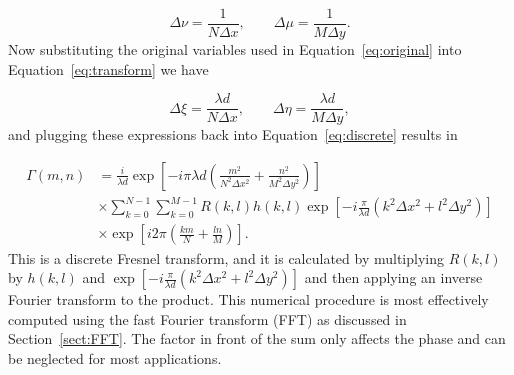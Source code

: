     \begin{equation}
        \Delta\nu=\frac{1}{N\Delta x}, \qquad \Delta\mu=\frac{1}{M\Delta y}.
        \label{eq:transform}
    \end{equation}
    Now substituting the original variables used in Equation~\ref{eq:original} into
    Equation~\ref{eq:transform} we have

    \begin{equation}
        \Delta\xi=\frac{\lambda d}{N\Delta x}, \qquad \Delta\eta=\frac{
        \lambda d}{M\Delta y},
    \end{equation}
    and plugging these expressions back into Equation~\ref{eq:discrete} results
    in

    \begin{equation}
    \begin{aligned}
        \Gamma(m,n) & = \frac{i}{\lambda d}\exp\left[ -i\pi \lambda d\left(
            \frac{m^2}{N^2\Delta x^2}+\frac{n^2}{M^2\Delta y^2}
        \right)\right]\\
        &\times
        \sum_{k=0}^{N-1}\sum_{k=0}^{M-1}R(k,l)h(k,l)\exp\left[ -i
        \frac{\pi}{\lambda d}\left( k^2\Delta x^2+l^2\Delta y^2 \right)
    \right] \\
    &\times \exp\left[ i2\pi\left( \frac{km}{N}+\frac{ln}{M} \right) \right].
    \end{aligned}
    \end{equation}
    This is a discrete Fresnel transform, and it is calculated by multiplying
    $R(k,l)$ by $h(k,l)$ and $\exp\left[ -i
        \frac{\pi}{\lambda d}\left( k^2\Delta x^2+l^2\Delta y^2 \right)
    \right]$
    and then applying an inverse Fourier transform to the product. This
    numerical procedure is
    most effectively computed using the fast Fourier transform (FFT) as
    discussed in Section~\ref{sect:FFT}. The factor
    in front of the sum only affects the phase and can be neglected for
    most applications.


